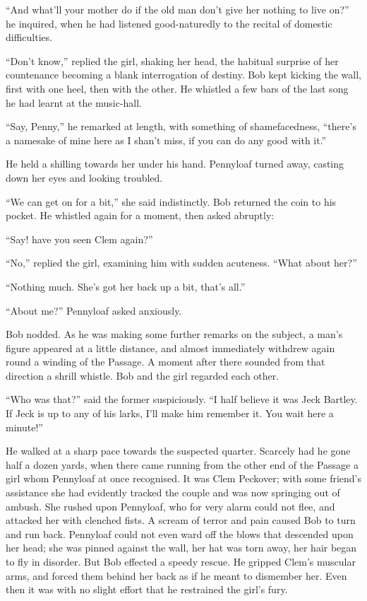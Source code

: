 {}``And what'll your mother do if the old man don't give her nothing to
live on?'' he inquired, when he had listened good-naturedly to the
recital of domestic difficulties.

``Don't know,'' replied the girl, shaking her head, the habitual
surprise of her countenance becoming a blank interrogation of destiny.
Bob kept kicking the wall, first with one heel, then with the other. He
whistled a few bars of the last song he had learnt at the music-hall.

``Say, Penny,'' he remarked at length, with something of shamefacedness,
``there's a namesake of mine here as I shan't miss, if you can do any
good with it.''

He held a shilling towards her under his hand. Pennyloaf turned away,
casting down her eyes and looking troubled.

``We can get on for a bit,'' she said indistinctly. Bob returned the
coin to his pocket. He whistled again for a moment, then asked abruptly:

{}``Say! have you seen Clem again?''

``No,'' replied the girl, examining him with sudden acuteness. ``What
about her?''

``Nothing much. She's got her back up a bit, that's all.''

``About me?'' Pennyloaf asked anxiously.

Bob nodded. As he was making some further remarks on the subject, a
man's figure appeared at a little distance, and almost immediately
withdrew again round a winding of the Passage. A moment after there
sounded from that direction a shrill whistle. Bob and the girl regarded
each other.

``Who was that?'' said the former suspiciously. ``I half believe it was
Jeck Bartley. If Jeck is up to any of his larks, I'll make him remember
it. You wait here a minute!''

He walked at a sharp pace towards the suspected quarter. Scarcely had he
gone half a dozen yards, when there came running from the other end of
the Passage a girl whom Pennyloaf at once recognised. It was Clem
Peckover; with some friend's assistance she {}had evidently tracked the
couple and was now springing out of ambush. She rushed upon Pennyloaf,
who for very alarm could not flee, and attacked her with clenched fists.
A scream of terror and pain caused Bob to turn and run back. Pennyloaf
could not even ward off the blows that descended upon her head; she was
pinned against the wall, her hat was torn away, her hair began to fly in
disorder. But Bob effected a speedy rescue. He gripped Clem's muscular
arms, and forced them behind her back as if he meant to dismember her.
Even then it was with no slight effort that he restrained the girl's
fury.

